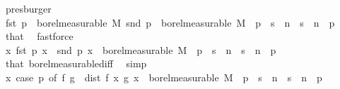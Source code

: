 \begin{isabellebody}
\ presburger\isanewline
\ \ \isamarkupfalse%
\ {\isachardoublequoteopen}fst\ p\ {\isasymin}\ borel{\isacharunderscore}{\kern0pt}measurable\ M{\isachardoublequoteclose}\ {\isachardoublequoteopen}snd\ p\ {\isasymin}\ borel{\isacharunderscore}{\kern0pt}measurable\ M{\isachardoublequoteclose}\ \ {\isachardoublequoteopen}p\ {\isasymin}\ s\ {\isacharbackquote}{\kern0pt}\ {\isacharbraceleft}{\kern0pt}n{\isachardot}{\kern0pt}{\isachardot}{\kern0pt}{\isacharbraceright}{\kern0pt}\ {\isasymtimes}\ s\ {\isacharbackquote}{\kern0pt}\ {\isacharbraceleft}{\kern0pt}n{\isachardot}{\kern0pt}{\isachardot}{\kern0pt}{\isacharbraceright}{\kern0pt}{\isachardoublequoteclose}\ \ p\ \isamarkupfalse%
\ that\ \isamarkupfalse%
\ fastforce{\isacharplus}{\kern0pt}\isanewline
\ \ \isamarkupfalse%
\ {\isachardoublequoteopen}{\isacharparenleft}{\kern0pt}{\isasymlambda}x{\isachardot}{\kern0pt}\ fst\ p\ x\ {\isacharminus}{\kern0pt}\ snd\ p\ x{\isacharparenright}{\kern0pt}\ {\isasymin}\ borel{\isacharunderscore}{\kern0pt}measurable\ M{\isachardoublequoteclose}\ \ {\isachardoublequoteopen}p\ {\isasymin}\ s\ {\isacharbackquote}{\kern0pt}\ {\isacharbraceleft}{\kern0pt}n{\isachardot}{\kern0pt}{\isachardot}{\kern0pt}{\isacharbraceright}{\kern0pt}\ {\isasymtimes}\ s\ {\isacharbackquote}{\kern0pt}\ {\isacharbraceleft}{\kern0pt}n{\isachardot}{\kern0pt}{\isachardot}{\kern0pt}{\isacharbraceright}{\kern0pt}{\isachardoublequoteclose}\ \ p\ \isamarkupfalse%
\ that\ borel{\isacharunderscore}{\kern0pt}measurable{\isacharunderscore}{\kern0pt}diff\ \isamarkupfalse%
\ simp\isanewline
\ \ \isamarkupfalse%
\ {\isachardoublequoteopen}{\isacharparenleft}{\kern0pt}{\isasymlambda}x{\isachardot}{\kern0pt}\ case\ p\ of\ {\isacharparenleft}{\kern0pt}f{\isacharcomma}{\kern0pt}\ g{\isacharparenright}{\kern0pt}\ {\isasymRightarrow}\ dist\ {\isacharparenleft}{\kern0pt}f\ x{\isacharparenright}{\kern0pt}\ {\isacharparenleft}{\kern0pt}g\ x{\isacharparenright}{\kern0pt}{\isacharparenright}{\kern0pt}\ {\isasymin}\ borel{\isacharunderscore}{\kern0pt}measurable\ M{\isachardoublequoteclose}\ \ {\isachardoublequoteopen}p\ {\isasymin}\ s\ {\isacharbackquote}{\kern0pt}\ {\isacharbraceleft}{\kern0pt}n{\isachardot}{\kern0pt}{\isachardot}{\kern0pt}{\isacharbraceright}{\kern0pt}\ {\isasymtimes}\ s\ {\isacharbackquote}{\kern0pt}\ {\isacharbraceleft}{\kern0pt}n{\isachardot}{\kern0pt}{\isachardot}{\kern0pt}{\isacharbraceright}{\kern0pt}{\isachardoublequoteclose}\ \ p\ \isamarkupfalse%

\end{isabellebody}
